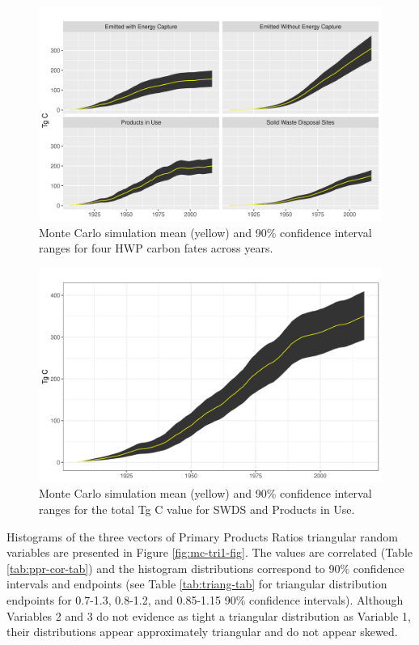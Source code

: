 \documentclass[
  openany]{book}
\begin{document}
\begin{figure}
\includegraphics[width=1\linewidth]{images/MC_all4} \caption{Monte Carlo simulation mean (yellow) and 90\% confidence interval ranges for four HWP carbon fates across years.}\label{fig:mc-all4-fig}
\end{figure}

\begin{figure}
\includegraphics[width=1\linewidth]{images/MC_piu_swds} \caption{Monte Carlo simulation mean (yellow) and 90\% confidence interval ranges for the total Tg C value for SWDS and Products in Use.}\label{fig:mc-piu-swds-fig}
\end{figure}

Histograms of the three vectors of Primary Products Ratios triangular random variables are presented in Figure \ref{fig:mc-tri1-fig}. The values are correlated (Table \ref{tab:ppr-cor-tab}) and the histogram distributions correspond to 90\% confidence intervals and endpoints (see Table \ref{tab:triang-tab} for triangular distribution endpoints for 0.7-1.3, 0.8-1.2, and 0.85-1.15 90\% confidence intervals). Although Variables 2 and 3 do not evidence as tight a triangular distribution as Variable 1, their distributions appear approximately triangular and do not appear skewed.
\end{document}
